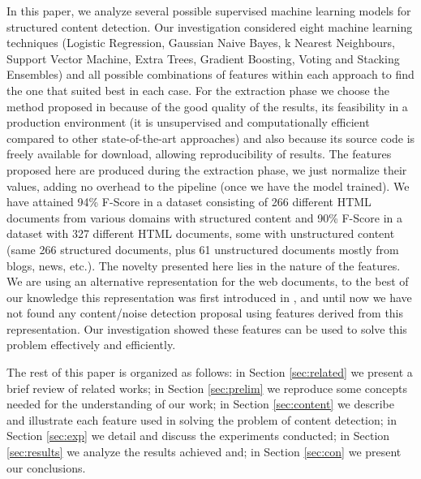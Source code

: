 In this paper, we analyze several possible supervised machine learning models
for structured content detection. Our investigation considered eight machine
learning techniques (Logistic Regression, Gaussian Naive Bayes, k Nearest
Neighbours, Support Vector Machine, Extra Trees, Gradient Boosting, Voting and
Stacking Ensembles) and all possible combinations of features within each
approach to find the one that suited best in each case. For the extraction phase
we choose the method proposed in \cite{Velloso:2017:ERW:3132847.3132875} because
of the good quality of the results, its feasibility in a production environment
(it is unsupervised and computationally efficient compared to other
state-of-the-art approaches) and also because its source code is freely
available for download, allowing reproducibility of results.
The features proposed here are produced during the extraction phase, we just
normalize their values, adding no overhead to the pipeline (once we have the
model trained). We have attained 94\% F-Score in a dataset consisting of 266
different HTML documents from various domains with structured content and 90\%
F-Score in a dataset with 327 different HTML documents, some with unstructured
content (same 266 structured documents, plus 61 unstructured documents mostly
from blogs, news, etc.).
The novelty presented here lies in the nature of the features. We are using an
alternative representation for the web documents, to the best of our knowledge
this representation was first introduced in \cite{TPC09}, and until now we have
not found any content/noise detection proposal using features derived from this
representation. Our investigation showed these features can be used to solve
this problem effectively and efficiently.

The rest of this paper is organized as follows: in Section \ref{sec:related} we
present a brief review of related works; in Section \ref{sec:prelim} we
reproduce some concepts needed for the understanding of our work; in Section
\ref{sec:content} we describe and illustrate each feature used in solving the
problem of content detection; in Section \ref{sec:exp} we detail and discuss the
experiments conducted; in Section \ref{sec:results} we analyze the results
achieved and; in Section \ref{sec:con} we present our conclusions.

